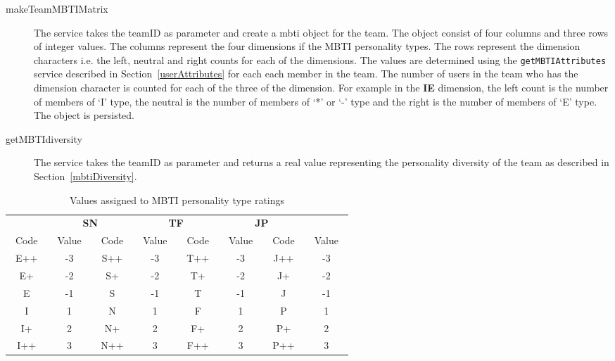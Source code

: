\begin{description}
\item[makeTeamMBTIMatrix] The service takes the teamID as parameter and create a mbti object for the team. The object consist of four columns and three rows of integer values. The columns represent the four dimensions if the MBTI personality types. The rows represent the dimension characters  i.e. the left, neutral and right counts for each of the dimensions. The values are determined using the \texttt{getMBTIAttributes} service described in Section~\ref{userAttributes} for each each member in the team. The number of users in the team who has the dimension character is counted for each of the three  of the dimension. For example in the \textbf{IE} dimension, the left count is the number of members of `I' type, the neutral is the number of members of `*' or `-' type and the right is the number of members of `E' type. The object is persisted.
\item[getMBTIdiversity] The service takes the teamID as parameter and returns a real value representing the personality diversity of the team as described in Section~\ref{mbtiDiversity}.
\end{description}  



\begin{table}[h]
\centering
\caption{Values assigned to MBTI personality type ratings \label{tab:mbti_ratings}}
\begin{tabular}{cc|cc|cc|cc}

\hline
\noalign{\smallskip}
\multicolumn{2}{c}{\textbf{IE}}  & \multicolumn{2}{c}{\textbf{SN}} & \multicolumn{2}{c}{\textbf{TF}} & \multicolumn{2}{c}{\textbf{JP}} \\
~Code~ & ~Value~ & ~Code~ & ~Value~ & ~Code~ & ~Value~ & ~Code~ & ~Value~\\
\noalign{\smallskip}
\hline
E++ & -3  & S++ & -3 & T++ & -3 & J++ & -3\\
E+ & -2 & S+ & -2 & T+ & -2 & J+ & -2  \\
E & -1 & S & -1 & T & -1 & J & -1  \\
I & 1 & N & 1 & F & 1 & P & 1 \\
I+ & 2  & N+ & 2 & F+ & 2 & P+ & 2 \\
I++ & 3 & N++  & 3 & F++  & 3 & P++  & 3 \\
\hline
\end{tabular}
\end{table}






